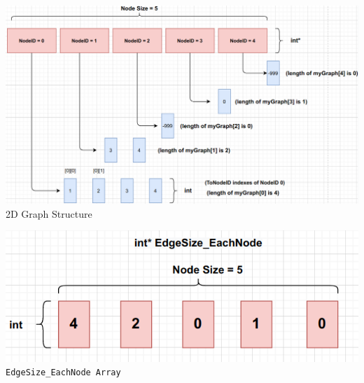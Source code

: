 \documentclass{article}
\begin{document}
\begin{center}
    \centering
    \includegraphics[scale=0.5]{img1.png}
    2D Graph Structure
     \label{fig:myGraph}
     
    
\end{center}
\begin{center}
    \centering
    \includegraphics[scale=0.5]{img2.png}
    \newline\texttt{EdgeSize\_EachNode Array}
    \label{fig:myGraph}
\end{center}
\end{document}
